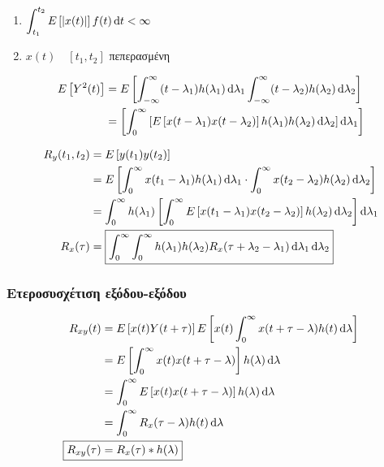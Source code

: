 \documentclass[11pt,a4paper,notitlepage,fleqn,final]{article}
\begin{document}
\begin{enumerate}
	\item \( \displaystyle
	\int_{t_1}^{t_2} E\left[\left|x(t)\right|\right]f(t)\mathop{}\!\mathrm{d} t
	< \infty
	 \)
	\item \( x(t)\quad [t_1,t_2] \) πεπερασμένη
\end{enumerate}

\begin{align*}
	E\left[Y^2(t)\right] &= E\left[
	\int_{-\infty}^{\infty} (t-\lambda_1)h(\lambda_1)\mathop{}\!\mathrm{d}\lambda_1
	\int_{-\infty}^{\infty} (t-\lambda_2)h(\lambda_2)\mathop{}\!\mathrm{d}\lambda_2
	\right]
	\\ &= \left[
	\int_{0}^{\infty} \left[
	        E\left[
	            x(t-\lambda_1)x(t-\lambda_2)
	        \right] h(\lambda_1)h(\lambda_2)\mathop{}\!\mathrm{d}\lambda_2
	    \right] \mathop{}\!\mathrm{d}\lambda_1
	\right]
\end{align*}

\begin{align*}
	R_y(t_1,t_2) &= E\left[y(t_1)y(t_2)\right]
	\\ &= E\left[\int_{0}^{\infty}
	x(t_1-\lambda_1)h(\lambda_1)\mathop{}\!\mathrm{d}\lambda_1
	\cdot
	\int_{0}^{\infty} x(t_2-\lambda_2)h(\lambda_2)\mathop{}\!\mathrm{d}\lambda_2
	\right]
	\\ &= \int_{0}^{\infty}
	h(\lambda_1)\left[\int_{0}^{\infty}
	E\left[x(t_1-\lambda_1)x(t_2-\lambda_2)
	\right]h(\lambda_2)\mathop{}\!\mathrm{d}\lambda_2
	\right]\mathop{}\!\mathrm{d}\lambda_1 \\
	R_x(\tau) &= \boxed{
	    \int_{0}^{\infty}
	    \int_{0}^{\infty}
	    h(\lambda_1)h(\lambda_2)
	    R_x(\tau+\lambda_2-\lambda_1)\mathop{}\!\mathrm{d}\lambda_1\mathop{}\!\mathrm{d}\lambda_2
    }
\end{align*}

\subsubsection{Ετεροσυσχέτιση εξόδου-εξόδου}
\begin{align*}
	R_{xy}(t) &= E\left[x(t)Y(t+\tau)\right]
	E\left[x(t)
	\int_{0}^{\infty} x(t+\tau - \lambda)h(t)\dif\lambda
	\right]
	\\ &= E\left[
	\int_{0}^{\infty} x(t) x(t+\tau-\lambda)
	\right] h(\lambda)\dif\lambda
	\\ &= \int_{0}^{\infty} E\left[
	x(t)x(t+\tau - \lambda)
	\right] h(\lambda) \dif\lambda
	\\ &= \int_{0}^{\infty}
	R_x (\tau - \lambda)h(t)\dif\lambda
	\\
	\Aboxed{R_{xy}(\tau) &= R_x(\tau) * h(\lambda)}
\end{align*}
\end{document}
